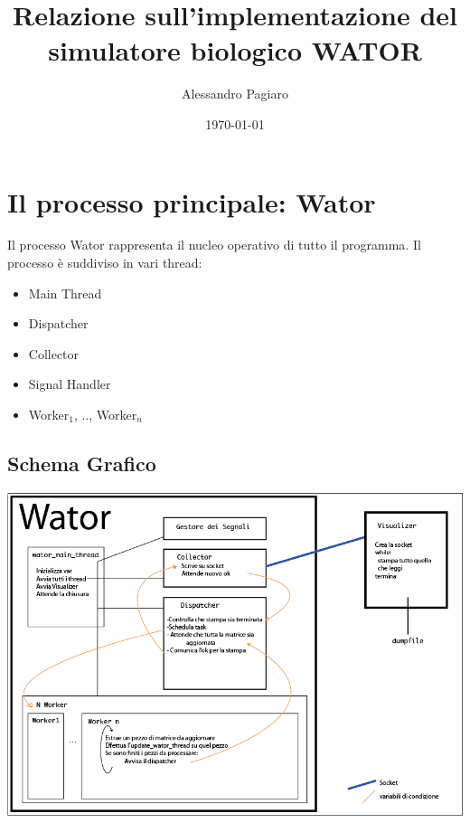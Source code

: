 \documentclass[]{article}
\begin{document}
\newcommand{\campo}[1]{\mathbb{#1}}


\title{Relazione sull'implementazione del simulatore biologico WATOR}
\author{Alessandro Pagiaro}
\date{\today}
\maketitle
\tableofcontents
\clearpage

\section{Il processo principale: Wator}
Il processo Wator rappresenta il nucleo operativo di tutto il programma. Il processo è suddiviso in vari thread:
\begin{itemize}
	\item Main Thread
	\item Dispatcher
	\item Collector
	\item Signal Handler
	\item Worker$_1$, .., Worker$_n$
\end{itemize}

\subsection{Schema Grafico}
\includegraphics[width=400pt]{wator.png}
\end{document}
